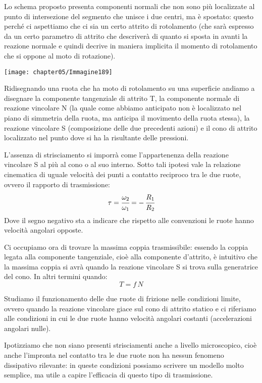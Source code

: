 Lo schema proposto presenta componenti normali che non sono più localizzate al punto di intersezione del segmento che unisce i due centri, ma è spostato: questo perché ci aspettiamo che ci sia un certo attrito di rotolamento (che sarà espresso da un certo parametro di attrito che descriverà di quanto si sposta in avanti la reazione normale e quindi decrive in maniera implicita il momento di rotolamento che si oppone al moto di rotazione).

\begin{minipage}{.29\textwidth}
\centering
\texttt{[image: chapter05/Immagine189]}
\end{minipage}
\hfill
\begin{minipage}{.71\textwidth}
Ridisegnando una ruota che ha moto di rotolamento su una superficie andiamo a disegnare la componente tangenziale di attrito T, la componente normale di reazione vincolare N (la quale come abbiamo anticipato non è localizzato nel piano di simmetria della ruota, ma anticipa il movimento della ruota stessa), la reazione vincolare S (composizione delle due precedenti azioni) e il cono di attrito localizzato nel punto dove si ha la risultante delle pressioni.
\end{minipage}

L'assenza di strisciamento si imporrà come l'appartenenza della reazione vincolare S al più al cono o al suo interno. Sotto tali ipotesi vale la relazione cinematica di uguale velocità dei punti a contatto reciproco tra le due ruote, ovvero il rapporto di trasmissione:
\[\tau = \cfrac{\omega_2}{\omega_1} = -\,\cfrac{R_1}{R_2}\]
Dove il segno negativo sta a indicare che rispetto alle convenzioni le ruote hanno velocità angolari opposte.

Ci occupiamo ora di trovare la massima coppia trasmissibile: essendo la coppia legata alla componente tangenziale, cioè alla componente d'attrito, è intuitivo che la massima coppia si avrà quando la reazione vincolare S si trova sulla generatrice del cono. In altri termini quando:
\[T = f\,N\]

Studiamo il funzionamento delle due ruote di frizione nelle condizioni limite, ovvero quando la reazione vincolare giace sul cono di attrito statico e ci riferiamo alle condizioni in cui le due ruote hanno velocità angolari costanti (accelerazioni angolari nulle).

Ipotizziamo che non siano presenti strisciamenti anche a livello microscopico, cioè anche l'impronta nel contatto tra le due ruote non ha nessun fenomeno dissipativo rilevante: in queste condizioni possiamo scrivere un modello molto semplice, ma utile a capire l'efficacia di questo tipo di trasmissione.


